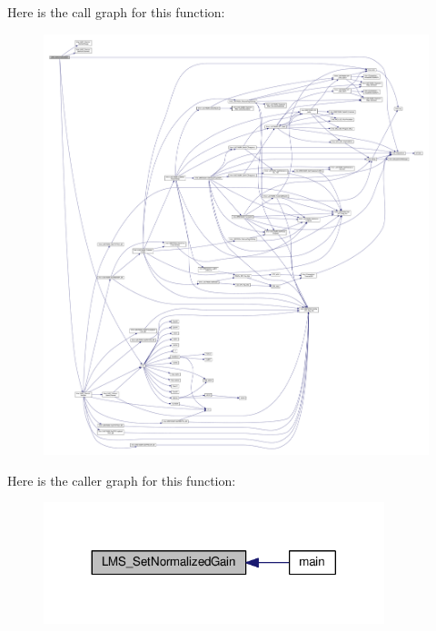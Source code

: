 Here is the call graph for this function\+:
\nopagebreak
\begin{figure}[H]
\begin{center}
\leavevmode
\includegraphics[width=350pt]{df/de1/lms7__api_8cpp_ad56e10da5335c7c8f74e31dd85d1e288_cgraph}
\end{center}
\end{figure}




Here is the caller graph for this function\+:
\nopagebreak
\begin{figure}[H]
\begin{center}
\leavevmode
\includegraphics[width=281pt]{df/de1/lms7__api_8cpp_ad56e10da5335c7c8f74e31dd85d1e288_icgraph}
\end{center}
\end{figure}


